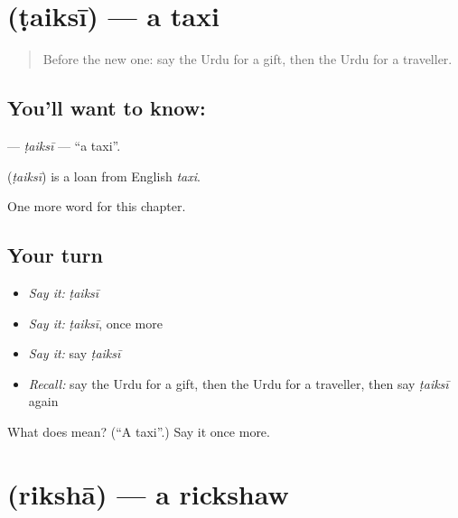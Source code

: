 \section[\texorpdfstring{\ur{ٹیکسی} (ṭaiksī)}{ٹیکسی (ṭaiksī)}]{ (ṭaiksī) — a taxi}

\label{lesson:UR-C202-taiksi}



\begin{quote}
Before the new one: say the Urdu for a gift, then the Urdu for a traveller.
\end{quote}

\subsection*{You'll want to know: }
\textbf{} — \emph{ṭaiksī} — \textquotedblleft{}a taxi\textquotedblright{}.

\begin{cousinweb}
\textbf{} (\emph{ṭaiksī}) is a loan from English \emph{taxi}.
\end{cousinweb}

\begin{grammarlens}[title={What you've built}]
One more word for this chapter.
\end{grammarlens}

\subsection*{Your turn}
\begin{itemize}
\raggedright
  \item \emph{Say it:} \emph{ṭaiksī}
  \item \emph{Say it:} \emph{ṭaiksī}, once more
  \item \emph{Say it:} say \emph{ṭaiksī}
  \item \emph{Recall:} say the Urdu for a gift, then the Urdu for a traveller, then say \emph{ṭaiksī} again
\end{itemize}

\begin{tcolorbox}[breakable,colback=teal!4,colframe=teal!35!black,title={Before you move on}]
What does  mean? (\textquotedblleft{}A taxi\textquotedblright{}.) Say it once more.
\end{tcolorbox}
\section[\texorpdfstring{\ur{رکشہ} (rikshā)}{رکشہ (rikshā)}]{ (rikshā) — a rickshaw}

